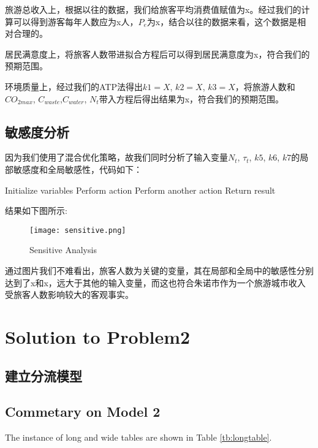 \documentclass[12pt]{article}  %
\begin{document}
旅游总收入上，根据以往的数据，我们给旅客平均消费值赋值为x。经过我们的计算可以得到游客每年人数应为x人，$P_e$为x，结合以往的数据来看，这个数据是相对合理的。

居民满意度上，将旅客人数带进拟合方程后可以得到居民满意度为x，符合我们的预期范围。

环境质量上，经过我们的ATP法得出$k1 = X$, $k2 = X$, $k3 = X$，将旅游人数和$CO_{2max}$, $C_{waste}$,$C_{water}$, $N_t$带入方程后得出结果为x，符合我们的预期范围。
\subsection{敏感度分析}
因为我们使用了混合优化策略，故我们同时分析了输入变量$N_t$, $\tau _t$, $k5$, $k6$, $k7$的局部敏感度和全局敏感性，代码如下：
\begin{algorithm}
	\caption{$Sensitive Analysis$}
	\begin{algorithmic}[1]
		\STATE Initialize variables
				\STATE Perform action
			\ELSE
				\STATE Perform another action
			\ENDIF
		\ENDFOR
		\STATE Return result
	\end{algorithmic}
\end{algorithm}

结果如下图所示:
\begin{figure}[H]
	\centering
	\texttt{[image: sensitive.png]}
	\caption{Sensitive Analysis}\label{fig:sensitive}
\end{figure}

通过图片我们不难看出，旅客人数为关键的变量，其在局部和全局中的敏感性分别达到了x和x，远大于其他的输入变量，而这也符合朱诺市作为一个旅游城市收入受旅客人数影响较大的客观事实。
\section{Solution to Problem2}
\subsection{建立分流模型}

\subsection{Commetary on Model 2}
The instance of long and wide tables are shown in Table \ref{tb:longtable}.
\end{document}
